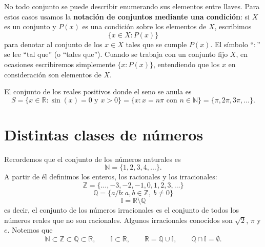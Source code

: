 \documentclass[12pt,a4paper]{book}
\begin{document}
  No todo conjunto se puede describir enumerando sus elementos entre llaves. Para estos casos usamos la \textbf{notación de conjuntos mediante una condición}: si $X$ es un conjunto y $P(x)$ es una condición sobre los elementos de $X$, escribimos
  \begin{equation*}
    \{x \in X : P(x)\}
  \end{equation*}
  para denotar al conjunto de los $x \in X$ tales que se cumple $P(x)$. El símbolo ``$:$'' se lee ``tal que'' (o ``tales que''). Cuando se trabaja con un conjunto fijo $X$, en ocasiones escribiremos simplemente $\{x : P(x)\}$, entendiendo que los $x$ en consideración son elementos de $X$.

  \begin{ejemplo}
    El conjunto de los reales positivos donde el seno se anula es
    \begin{equation*}
      S=\{x\in\mathbb{R} : \sin(x)=0 \text{ y } x>0\}=\{x : x=n\pi \text{ con } n\in\mathbb{N}\}=\{\pi,2\pi,3\pi,\dots\}.
    \end{equation*}
  \end{ejemplo}

  \section{Distintas clases de números}
  
  Recordemos que el conjunto de los números naturales es
  \begin{equation*}
    \mathbb{N} = \{1,2,3,4,\dots\}.
  \end{equation*}
  A partir de él definimos los enteros, los racionales y los irracionales:
  \begin{equation*}
    \mathbb{Z} = \{\dots,-3,-2,-1,0,1,2,3,\dots\}
  \end{equation*}
  \begin{equation*}
    \mathbb{Q} = \{a/b : a,b \in \mathbb{Z},\ b \neq 0\}
  \end{equation*}
  \begin{equation*}
    \mathbb{I} = \mathbb{R}\setminus\mathbb{Q}
  \end{equation*}
  es decir, el conjunto de los números irracionales es el conjunto de todos los números reales que no son racionales. Algunos irracionales conocidos son $\sqrt{2}$, $\pi$ y $e$. Notemos que
  \begin{equation*}
    \mathbb{N} \subset \mathbb{Z} \subset \mathbb{Q} \subset \mathbb{R}, \qquad \mathbb{I} \subset \mathbb{R}, \qquad \mathbb{R} = \mathbb{Q} \cup \mathbb{I}, \qquad \mathbb{Q} \cap \mathbb{I} = \emptyset.
  \end{equation*}
  
\end{document}
